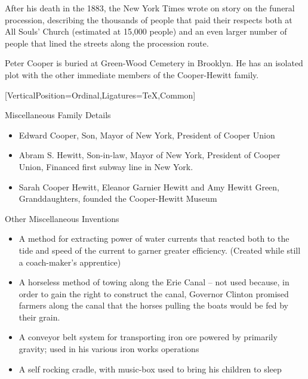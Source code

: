 \documentclass{article}
\begin{document}
\begin{minipage}[t]{0.45\linewidth}
\begin{enumList}
\item After his death in the 1883, the New York Times wrote on story on the
funeral procession, describing the { thousands of people
that paid their respects} both at All Souls' Church (estimated at 15,000 people)
and an even larger number of people that lined the streets along the procession
route.

\item Peter Cooper is buried at { Green-Wood Cemetery} in
Brooklyn. He has an isolated plot with the other immediate members of the
Cooper-Hewitt family.

\setcounter{enumTemp}{\value{enumListi}}
\end{enumList}
\end{minipage}\hfill
\begin{minipage}[t]{0.45\linewidth}
[VerticalPosition=Ordinal,Ligatures={TeX,Common}]
\fontsize{11pt}{13pt}\selectfont
\raggedright
\upshape
\begin{enumList}
\setcounter{enumListi}{\value{enumTemp}}

\item Miscellaneous Family Details
\begin{itemize}[leftmargin=*]
\item Edward Cooper, Son, Mayor of New York, President of Cooper Union
\item Abram S. Hewitt, Son-in-law, Mayor of New York, President of Cooper Union,
Financed first subway line in New York.
\item Sarah Cooper Hewitt, Eleanor Garnier Hewitt and Amy Hewitt Green,
Granddaughters, founded the Cooper-Hewitt Museum
\end{itemize}

\item Other Miscellaneous Inventions
\begin{itemize}[leftmargin=*]
\item A method for extracting power of water currents that reacted both to the
tide and speed of the current to garner greater efficiency. (Created while
still a coach-maker's apprentice)
\item A horseless method of towing along the Erie Canal -- not used because, in
order to gain the right to construct the canal, Governor Clinton promised
farmers along the canal that the horses pulling the boats would be fed by their
grain.
\item A conveyor belt system for transporting iron ore powered by
primarily gravity; used in his various iron works operations
\item A self rocking cradle, with music-box used to bring his children to sleep
\end{itemize}
\end{enumList}


\end{minipage}
\end{document}
